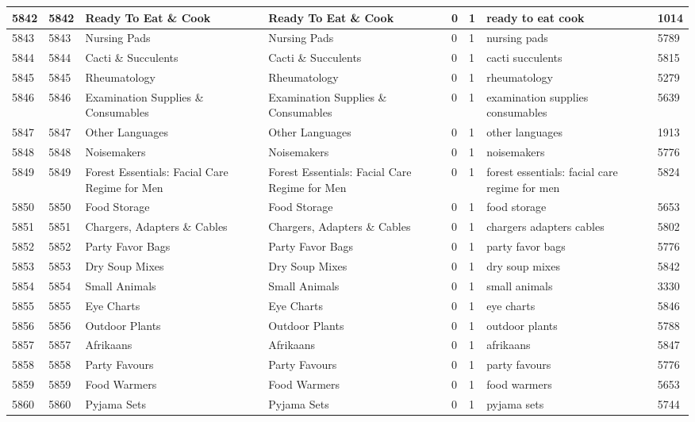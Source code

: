 \begin{longtable}{|l|l|l|l|l|l|l|l|}
5842 & 5842 & Ready To Eat \& Cook & Ready To Eat \& Cook & 0 & 1 & ready to eat cook & 1014 \\ \hline 
5843 & 5843 & Nursing Pads & Nursing Pads & 0 & 1 & nursing pads & 5789 \\ \hline 
5844 & 5844 & Cacti \& Succulents & Cacti \& Succulents & 0 & 1 & cacti succulents & 5815 \\ \hline 
5845 & 5845 & Rheumatology & Rheumatology & 0 & 1 & rheumatology & 5279 \\ \hline 
5846 & 5846 & Examination Supplies \& Consumables & Examination Supplies \& Consumables & 0 & 1 & examination supplies consumables & 5639 \\ \hline 
5847 & 5847 & Other Languages & Other Languages & 0 & 1 & other languages & 1913 \\ \hline 
5848 & 5848 & Noisemakers & Noisemakers & 0 & 1 & noisemakers & 5776 \\ \hline 
5849 & 5849 & Forest Essentials: Facial Care Regime for Men & Forest Essentials: Facial Care Regime for Men & 0 & 1 & forest essentials: facial care regime for men & 5824 \\ \hline 
5850 & 5850 & Food Storage & Food Storage & 0 & 1 & food storage & 5653 \\ \hline 
5851 & 5851 & Chargers, Adapters \& Cables & Chargers, Adapters \& Cables & 0 & 1 & chargers adapters cables & 5802 \\ \hline 
5852 & 5852 & Party Favor Bags & Party Favor Bags & 0 & 1 & party favor bags & 5776 \\ \hline 
5853 & 5853 & Dry Soup Mixes & Dry Soup Mixes & 0 & 1 & dry soup mixes & 5842 \\ \hline 
5854 & 5854 & Small Animals & Small Animals & 0 & 1 & small animals & 3330 \\ \hline 
5855 & 5855 & Eye Charts & Eye Charts & 0 & 1 & eye charts & 5846 \\ \hline 
5856 & 5856 & Outdoor Plants & Outdoor Plants & 0 & 1 & outdoor plants & 5788 \\ \hline 
5857 & 5857 & Afrikaans & Afrikaans & 0 & 1 & afrikaans & 5847 \\ \hline 
5858 & 5858 & Party Favours & Party Favours & 0 & 1 & party favours & 5776 \\ \hline 
5859 & 5859 & Food Warmers & Food Warmers & 0 & 1 & food warmers & 5653 \\ \hline 
5860 & 5860 & Pyjama Sets & Pyjama Sets & 0 & 1 & pyjama sets & 5744 \\ \hline 

\end{longtable}
